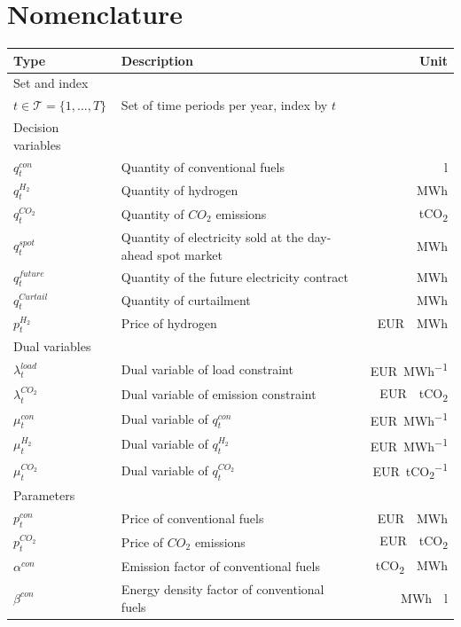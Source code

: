 \documentclass[review]{elsarticle}
\begin{document}
\section*{Nomenclature}
\begin{center}
	\renewcommand{\arraystretch}{1.1}
	\centering
	\small
	\begin{tabular}{lm{8cm}r}
		Type & Description & Unit\\
		\hline
		Set and index & & \\
		\hline
		{$t \in \mathcal{T}=\{1,\ldots,T\}$} & Set of time periods per year, index by $t$\\
		\hline
		Decision variables\\
		\hline
		{$q_{t}^{con}$} & Quantity of conventional fuels & \SI{}{\litre}\\
		{$q_{t}^{H_2}$} & Quantity of hydrogen & \SI{}{MWh}\\
		{$q_{t}^{CO_2}$} & Quantity of $CO_2$ emissions & \SI{}{tCO_2}\\
		{$q_{t}^{spot}$} & Quantity of electricity sold at the day-ahead spot market & \SI{}{MWh}\\
		{$q_{t}^{future}$} & Quantity of the future electricity contract & \SI{}{MWh}\\
		{$q_{t}^{Curtail}$} & Quantity of curtailment & \SI{}{MWh}\\
		{$p_{t}^{H_2}$} & Price of hydrogen & \SI{}{EUR \per MWh}\\
		\hline
		Dual variables\\
		{$\lambda_{t}^{load}$} &Dual variable of load constraint & \SI{}{EUR\per MWh}\\
		{$\lambda_{t}^{CO_2}$} & Dual variable of emission constraint & \SI{}{EUR \per tCO_2}\\
		{$\mu_{t}^{con}$} & Dual variable of $q_{t}^{con}$ & \SI{}{EUR\per MWh}\\
		{$\mu_{t}^{H_2}$} & Dual variable of $q_{t}^{H_2}$ & \SI{}{EUR\per MWh}\\
		{$\mu_{t}^{CO_2}$} & Dual variable of $q_{t}^{CO_2}$ & \SI{}{EUR\per tCO_2}\\
		\hline
		Parameters\\
		\hline
		{$p_{t}^{con}$} & Price of conventional fuels & \SI{}{EUR \per MWh}\\
		{$p_{t}^{CO_2}$} & Price of $CO_2$ emissions & \SI{}{EUR \per tCO_2}\\
		{$\alpha^{con}$} & Emission factor of conventional fuels& \SI{}{tCO_2 \per MWh}\\
		{$\beta^{con}$} & Energy density factor of conventional fuels & \SI{}{MWh \per \litre}\\

\end{tabular}
\end{center}
\end{document}
